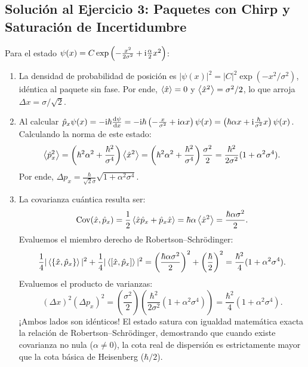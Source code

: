 \begin{appendices}
\subsection[Solución 3: Paquetes con chirp]{Solución al Ejercicio 3: Paquetes con Chirp y Saturación de Incertidumbre}
Para el estado $\psi(x) = C \exp\left(-\frac{x^2}{2\sigma^2} + \mathrm{i}\frac{\alpha}{2}x^2\right)$:
\begin{enumerate}
    \item La densidad de probabilidad de posición es $|\psi(x)|^2 = |C|^2 \exp(-x^2/\sigma^2)$, idéntica al paquete sin fase. Por ende, $\left\langle \hat{x} \right\rangle = 0$ y $\left\langle \hat{x}^2 \right\rangle = \sigma^2/2$, lo que arroja $\Delta x = \sigma/\sqrt{2}$.
    \item Al calcular $\hat{p}_x\psi(x) = -\mathrm{i}\hbar\frac{\mathrm{d}\psi}{\mathrm{d} x} = -\mathrm{i}\hbar\left(-\frac{x}{\sigma^2} + \mathrm{i}\alpha x\right)\psi(x) = \left(\hbar\alpha x + \mathrm{i}\frac{\hbar}{\sigma^2}x\right)\psi(x)$.\\
    Calculando la norma de este estado:
    \begin{equation}
        \left\langle \hat{p}_x^2 \right\rangle = \left(\hbar^2\alpha^2 + \frac{\hbar^2}{\sigma^4}\right)\left\langle \hat{x}^2 \right\rangle = \left(\hbar^2\alpha^2 + \frac{\hbar^2}{\sigma^4}\right)\frac{\sigma^2}{2} = \frac{\hbar^2}{2\sigma^2}(1 + \alpha^2\sigma^4).
    \end{equation}
    Por ende, $\Delta p_x = \frac{\hbar}{\sqrt{2}\sigma}\sqrt{1 + \alpha^2\sigma^4}$.
    \item La covarianza cuántica resulta ser:
    \begin{equation}
        \mathrm{Cov}(\hat{x}, \hat{p}_x) = \frac{1}{2}\left\langle \hat{x}\hat{p}_x + \hat{p}_x\hat{x} \right\rangle = \hbar\alpha\left\langle \hat{x}^2 \right\rangle = \frac{\hbar\alpha\sigma^2}{2}.
    \end{equation}
    Evaluemos el miembro derecho de Robertson--Schrödinger:
    \begin{equation}
        \frac{1}{4}|\left\langle \{\hat{x}, \hat{p}_x\} \right\rangle|^2 + \frac{1}{4}|\left\langle [\hat{x}, \hat{p}_x] \right\rangle|^2 = \left(\frac{\hbar\alpha\sigma^2}{2}\right)^2 + \left(\frac{\hbar}{2}\right)^2 = \frac{\hbar^2}{4}(1 + \alpha^2\sigma^4).
    \end{equation}
    Evaluemos el producto de varianzas:
    \begin{equation}
        (\Delta x)^2 (\Delta p_x)^2 = \left(\frac{\sigma^2}{2}\right)\left(\frac{\hbar^2}{2\sigma^2}(1 + \alpha^2\sigma^4)\right) = \frac{\hbar^2}{4}(1 + \alpha^2\sigma^4).
    \end{equation}
    ¡Ambos lados son idénticos! El estado satura con igualdad matemática exacta la relación de Robertson--Schrödinger, demostrando que cuando existe covarianza no nula ($\alpha \neq 0$), la cota real de dispersión es estrictamente mayor que la cota básica de Heisenberg ($\hbar/2$).
\end{enumerate}


\end{appendices}
